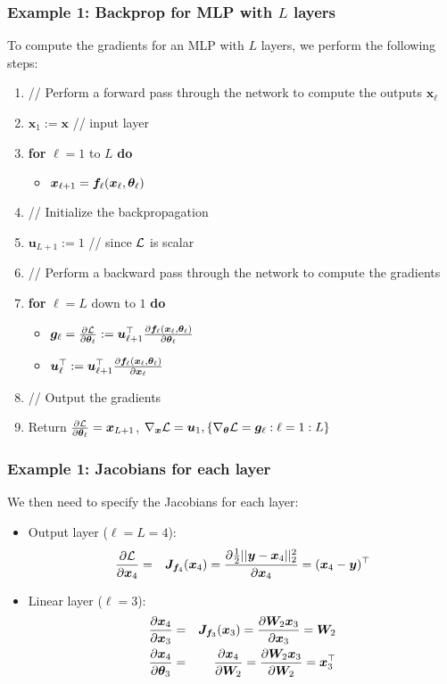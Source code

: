\documentclass[smaller, handout]{beamer}
\begin{document}
\begin{frame}
  \frametitle{Example 1:  Backprop for MLP with $L$ layers}
\pause To compute the gradients for an MLP with $L$ layers, we perform the following steps:\pause

\begin{enumerate}[<+->]
\item // Perform a forward pass through the network to compute the outputs $\bm x_{\ell}$
\item $\bm x_1 := \bm x$ // input layer
\item \textbf{for} $\ell = 1$ to $L$ \textbf{do}
  \begin{itemize}
  \item $\bm x_{\ell+1} = \bm f_\ell(\bm x_\ell, \bm{\theta}_\ell)$
  \end{itemize}
\item // Initialize the backpropagation
\item $\bm u_{L+1} := 1$ // since $\mathcal L$ is scalar
\item // Perform a backward pass through the network to compute the gradients
\item \textbf{for} $\ell = L$ down to $1$ \textbf{do}
  \begin{itemize}
  \item $ \bm g_\ell = \frac{\partial{\mathcal L}}{\partial{\bm{\theta}_\ell}} := \bm u_{\ell+1}^{\top} \frac{\partial{\bm f_\ell(\bm x_\ell, \bm{\theta}_\ell)}}{\partial{\bm{\theta}_\ell}}$
  \item $\bm u_{\ell}^{\top} := \bm u_{\ell+1}^{\top}\frac{\partial{\bm f_\ell(\bm x_\ell, \bm{\theta}_\ell)}}{\partial{\bm x_{\ell}}}$
  \end{itemize}
  \item // Output the gradients
  \item  Return $\frac{\partial{\mathcal L}}{\partial{\bm{\theta}_\ell}} = \bm x_{L+1}$, $\nabla_{\bm x}\mathcal L = \bm u_1, \{\nabla_{\bm{\theta}}\mathcal L = \bm g_\ell : \ell = 1:L\}$
\end{enumerate}
  

\end{frame}
\begin{frame}
  \frametitle{Example 1: Jacobians for each layer}\pause
We then need to specify the Jacobians for each layer:\pause
\begin{itemize}
\item Output layer ($\ell = L = 4$):
  \begin{eqnarray}
    \frac{\partial{\mathcal L}}{\partial{\bm x_4}} &=& \bm J_{\bm f_4}(\bm x_4) = \frac{\partial{\frac12||\bm y - \bm x_4||_2^2}}{\partial{\bm x_4}} = (\bm x_4 - \bm y)^{\top}
  \end{eqnarray}
  \pause
  \item Linear layer ($\ell = 3$):
    \begin{eqnarray}
    \frac{\partial{\bm x_4}}{\partial{\bm x_3}} &=& \bm J_{\bm f_3}(\bm x_3) = \frac{\partial{\bm W_2 \bm x_3}}{\partial{\bm x_3}} = \bm W_2 \\
    \frac{\partial{\bm x_4}}{\partial{\bm {\theta}_3}} &=& \frac{\partial{\bm x_4}}{\partial{\bm W_2}} = \frac{\partial{\bm W_2 \bm x_3}}{\partial{\bm W_2}} = \bm x_3^{\top}
  \end{eqnarray}
  
\end{itemize} 
\end{frame}
\end{document}

